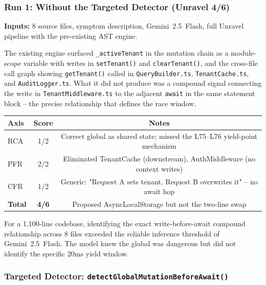 \documentclass[12pt,a4paper]{article}
\newcommand{\code}[1]{\texttt{\small #1}}
\begin{document}
\subsubsection{Run 1: Without the Targeted Detector (Unravel 4/6)}
\label{sec:superbug-run1}

\textbf{Inputs:} 8 source files, symptom description, Gemini~2.5~Flash, full Unravel
pipeline with the pre-existing AST engine.

The existing engine surfaced \code{\_activeTenant} in the mutation chain as a
module-scope variable with writes in \code{setTenant()} and \code{clearTenant()}, and
the cross-file call graph showing \code{getTenant()} called in \code{QueryBuilder.ts},
\code{TenantCache.ts}, and \code{AuditLogger.ts}. What it did not produce was a compound
signal connecting the write in \code{TenantMiddleware.ts} to the adjacent \code{await}
in the same statement block -- the precise relationship that defines the race window.

\begin{center}\small
\begin{tabular}{@{}lcc@{}}
\toprule
\textbf{Axis} & \textbf{Score} & \textbf{Notes} \\
\midrule
RCA & 1/2 & Correct global as shared state; missed the L75--L76 yield-point mechanism \\
PFR & 2/2 & Eliminated TenantCache (downstream), AuthMiddleware (no context writes) \\
CFR & 1/2 & Generic: "Request A sets tenant, Request B overwrites it" -- no await hop \\
\midrule
\textbf{Total} & \textbf{4/6} & Proposed AsyncLocalStorage but not the two-line swap \\
\bottomrule
\end{tabular}
\end{center}

For a 1,100-line codebase, identifying the exact write-before-await compound relationship
across 8 files exceeded the reliable inference threshold of Gemini~2.5~Flash. The model
knew the global was dangerous but did not identify the specific 20ms yield window.

\subsubsection{Targeted Detector: \code{detectGlobalMutationBeforeAwait()}}
\label{sec:superbug-detector}
\end{document}
